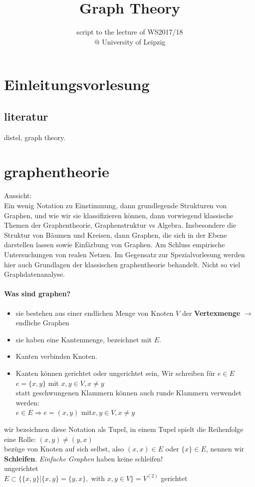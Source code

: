 \documentclass[a4paper]{article}
\title{\textbf{Graph Theory}}
\author{script to the lecture of  WS2017/18 \\
@ University of Leipzig}
\date{}
\theoremstyle{definition}
\theoremstyle{remark}
\begin{document}
\section{Einleitungsvorlesung}
\label{sec:einleitungsvorlesung}
\subsection{literatur}
\label{sub:literatur}
distel, graph theory.
\section{graphentheorie}
\label{sec:graphentheorie}
Aussicht:\\
Ein wenig Notation zu Einstimmung, dann grundlegende Strukturen von Graphen, und wie wir sie  klassifizieren können, 
dann vorwiegend klassische Themen der Graphentheorie, Graphenstruktur vs Algebra. Insbesondere die Struktur von Bäumen und Kreisen, dann Graphen, die sich in der Ebene darstellen lassen sowie Einfärbung von Graphen.
Am Schluss empirische Untersuchungen von realen Netzen.
Im Gegensatz zur Spezialvorlesung werden hier auch Grundlagen der klassischen graphentheorie behandelt. Nicht so viel Graphdatenanalyse.
 \paragraph{Was sind graphen?}%
  \label{par:was_sind_graphen_}
	\begin{itemize}
		\item sie bestehen aus einer endlichen Menge von Knoten $V$  der \textbf{Vertexmenge} $\rightarrow $ endliche Graphen
		\item sie haben eine Kantenmenge, bezeichnet mit $E$.
		\item Kanten verbinden Knoten.
		\item Kanten können gerichtet oder ungerichtet sein, Wir schreiben für $ e\in E$\\
		$  e=\{x,y\}$ mit $ x,y\in V, x\neq y$\\
statt geschwungenen Klammern können auch runde Klammern verwendet werden:\\
$ e\in E \Rightarrow e=(x,y)$ mit$ x,y\in V, x\neq y$
 \end{itemize}
wir bezeichnen diese Notation als Tupel, in einem Tupel spielt die Reihenfolge eine Rolle: $(x,y)\neq(y,x)$\\
bezüge von Knoten auf sich selbst, also $(x,x)\in E$ oder $\{x\}\in E$, nennen wir \textbf{Schleifen}. \textit{Einfache Graphen}  haben keine schleifen!\\
ungerichtet\\
$E\subset \{\{x,y\}|\{x,y\} =\{y,x\}, \textrm{ with } x,y\in V\}= V^{(2)}$
gerichtet\\
\end{document}
